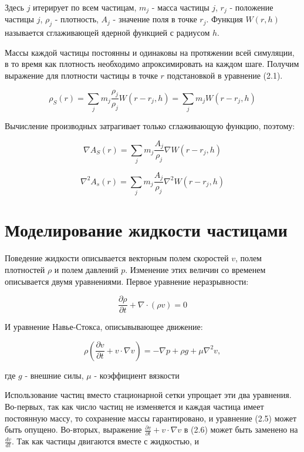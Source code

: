 Здесь $j$ итерирует по всем частицам, $m_j$ - масса частицы $j$, $r_j$ -
положение частицы $j$, $\rho_j$ - плотность, $A_j$ - значение поля в точке
$r_j$.
Функция $W(r, h)$ называется сглаживающей ядерной функцией с радиусом $h$.


Массы каждой частицы постоянны и одинаковы на протяжении всей симуляции, в то
время как плотность необходимо апроксимировать на каждом шаге. Получим выражение
для плотности частицы в точке $r$ подстановкой в уравнение (2.1).

\begin{equation}
	\rho_S(r) = \sum_j m_j \frac{\rho_j}{\rho_j} W(r - r_j, h) = \sum_j m_j W(r -
	r_j, h)
\end{equation}

Вычисление производных затрагивает только сглаживающую функцию, поэтому:

\begin{equation}
	\nabla A_S(r) = \sum_j m_j \frac{A_j}{\rho_j} \nabla W(r - r_j, h)
\end{equation}


\begin{equation}
	\nabla^2 A_s(r) = \sum_j m_j \frac{A_j}{\rho_j} \nabla^2 W(r - r_j, h)
\end{equation}

\section{Моделирование жидкости частицами}

Поведение жидкости описывается векторным полем скоростей $v$, полем плотностей
$\rho$ и полем давлений $p$. Изменение этих величин со временем описывается двумя уравнениями. Первое уравнение неразрывности:

\begin{equation}
	\frac{\partial \rho}{\partial t} + \nabla \cdot (\rho v) = 0
\end{equation}

И уравнение Навье-Стокса, описывывающее движение:

\begin{equation}
	\rho(\frac{\partial v}{\partial t} + v \cdot \nabla v) = - \nabla p + \rho g +
	\mu \nabla^2 v,
\end{equation}

где $g$ - внешние силы, $\mu$ - коэффициент вязкости

Использование частиц вместо стационарной сетки упрощает эти два уравнения.
Во-первых, так как число частиц не изменяется и каждая частица имеет постоянную массу, то
сохранение массы гарантировано, и уравнение (2.5) может быть опущено.
Во-вторых, выражение $\frac{\partial v}{\partial t} + v \cdot \nabla v$ в (2.6)
может быть заменено на $\frac{dv}{dt}$. Так как частицы двигаются вместе с
жидкостью, и

%
